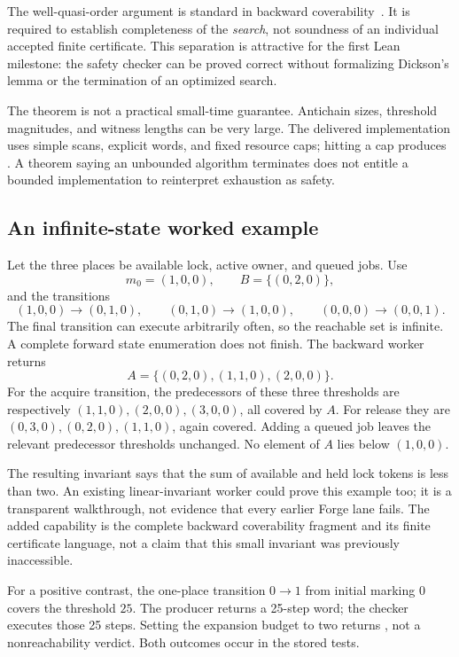 The well-quasi-order argument is standard in backward coverability~\cite{finkel-schnoebelen}. It is required to establish completeness of the \emph{search}, not soundness of an individual accepted finite certificate. This separation is attractive for the first Lean milestone: the safety checker can be proved correct without formalizing Dickson's lemma or the termination of an optimized search.

The theorem is not a practical small-time guarantee. Antichain sizes, threshold magnitudes, and witness lengths can be very large. The delivered implementation uses simple scans, explicit words, and fixed resource caps; hitting a cap produces . A theorem saying an unbounded algorithm terminates does not entitle a bounded implementation to reinterpret exhaustion as safety.

\subsection{An infinite-state worked example}
Let the three places be available lock, active owner, and queued jobs. Use
\[
 m_0=(1,0,0),\qquad B=\{(0,2,0)\},
\]
and the transitions
\[
 (1,0,0)\to(0,1,0),\qquad
 (0,1,0)\to(1,0,0),\qquad
 (0,0,0)\to(0,0,1).
\]
The final transition can execute arbitrarily often, so the reachable set is infinite. A complete forward state enumeration does not finish. The backward worker returns
\[
 A=\{(0,2,0),(1,1,0),(2,0,0)\}.
\]
For the acquire transition, the predecessors of these three thresholds are respectively $(1,1,0),(2,0,0),(3,0,0)$, all covered by $A$. For release they are $(0,3,0),(0,2,0),(1,1,0)$, again covered. Adding a queued job leaves the relevant predecessor thresholds unchanged. No element of $A$ lies below $(1,0,0)$.

The resulting invariant says that the sum of available and held lock tokens is less than two. An existing linear-invariant worker could prove this example too; it is a transparent walkthrough, not evidence that every earlier Forge lane fails. The added capability is the complete backward coverability fragment and its finite certificate language, not a claim that this small invariant was previously inaccessible.

For a positive contrast, the one-place transition $0\to1$ from initial marking $0$ covers the threshold $25$. The producer returns a 25-step word; the checker executes those 25 steps. Setting the expansion budget to two returns , not a nonreachability verdict. Both outcomes occur in the stored tests.

